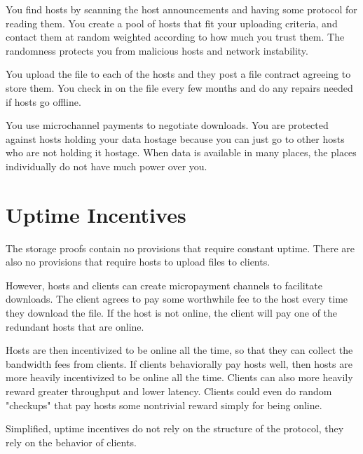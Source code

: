 \documentclass[twocolumn]{article}
\begin{document}
You find hosts by scanning the host announcements and having some protocol for reading them.
You create a pool of hosts that fit your uploading criteria, and contact them at random weighted according to how much you trust them.
The randomness protects you from malicious hosts and network instability.

You upload the file to each of the hosts and they post a file contract agreeing to store them.
You check in on the file every few months and do any repairs needed if hosts go offline.

You use microchannel payments to negotiate downloads.
You are protected against hosts holding your data hostage because you can just go to other hosts who are not holding it hostage.
When data is available in many places, the places individually do not have much power over you.

\section{Uptime Incentives}
The storage proofs contain no provisions that require constant uptime.
There are also no provisions that require hosts to upload files to clients.

However, hosts and clients can create micropayment channels to facilitate downloads.
The client agrees to pay some worthwhile fee to the host every time they download the file.
If the host is not online, the client will pay one of the redundant hosts that are online.

Hosts are then incentivized to be online all the time, so that they can collect the bandwidth fees from clients.
If clients behaviorally pay hosts well, then hosts are more heavily incentivized to be online all the time.
Clients can also more heavily reward greater throughput and lower latency.
Clients could even do random "checkups" that pay hosts some nontrivial reward simply for being online.

Simplified, uptime incentives do not rely on the structure of the protocol, they rely on the behavior of clients.

%
\end{document}
